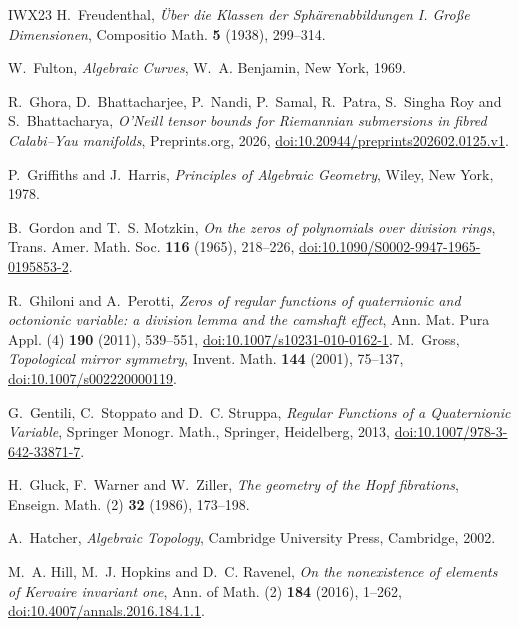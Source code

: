 \begin{thebibliography}{IWX23}
 H.~Freudenthal, \emph{\"Uber die Klassen der Sph\"arenabbildungen I. Gro\ss e Dimensionen}, Compositio Math. \textbf{5} (1938), 299--314.

 W.~Fulton, \emph{Algebraic Curves}, W.~A. Benjamin, New York, 1969.

 R.~Ghora, D.~Bhattacharjee, P.~Nandi, P.~Samal, R.~Patra, S.~Singha Roy and S.~Bhattacharya, \emph{O'Neill tensor bounds for Riemannian submersions in fibred Calabi--Yau manifolds}, Preprints.org, 2026, \href{https://doi.org/10.20944/preprints202602.0125.v1}{doi:10.20944/preprints202602.0125.v1}.

 P.~Griffiths and J.~Harris, \emph{Principles of Algebraic Geometry}, Wiley, New York, 1978.

 B.~Gordon and T.~S. Motzkin, \emph{On the zeros of polynomials over division rings}, Trans. Amer. Math. Soc. \textbf{116} (1965), 218--226, \href{https://doi.org/10.1090/S0002-9947-1965-0195853-2}{doi:10.1090/S0002-9947-1965-0195853-2}.

 R.~Ghiloni and A.~Perotti, \emph{Zeros of regular functions of quaternionic and octonionic variable: a division lemma and the camshaft effect}, Ann. Mat. Pura Appl. (4) \textbf{190} (2011), 539--551, \href{https://doi.org/10.1007/s10231-010-0162-1}{doi:10.1007/s10231-010-0162-1}.
 M.~Gross, \emph{Topological mirror symmetry}, Invent. Math. \textbf{144} (2001), 75--137, \href{https://doi.org/10.1007/s002220000119}{doi:10.1007/s002220000119}.

 G.~Gentili, C.~Stoppato and D.~C. Struppa, \emph{Regular Functions of a Quaternionic Variable}, Springer Monogr. Math., Springer, Heidelberg, 2013, \href{https://doi.org/10.1007/978-3-642-33871-7}{doi:10.1007/978-3-642-33871-7}.

 H.~Gluck, F.~Warner and W.~Ziller, \emph{The geometry of the Hopf fibrations}, Enseign. Math. (2) \textbf{32} (1986), 173--198.

 A.~Hatcher, \emph{Algebraic Topology}, Cambridge University Press, Cambridge, 2002.

 M.~A. Hill, M.~J. Hopkins and D.~C. Ravenel, \emph{On the nonexistence of elements of Kervaire invariant one}, Ann. of Math. (2) \textbf{184} (2016), 1--262, \href{https://doi.org/10.4007/annals.2016.184.1.1}{doi:10.4007/annals.2016.184.1.1}.


\end{thebibliography}
